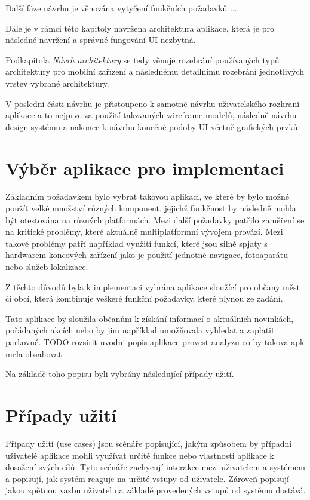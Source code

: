 Další fáze návrhu je věnována vytyčení funkčních požadavků ...

Dále je v rámci této kapitoly navržena architektura aplikace, která je pro následné navržení a správné fungování UI nezbytná. 

Podkapitola \textit{Návrh architektury} se tedy věnuje rozebrání používaných typů architektury pro mobilní zařízení a následnému detailnímu
rozebrání jednotlivých vrstev vybrané architektury.

V poslední části návrhu je přistoupeno k samotné návrhu uživatelského rozhraní aplikace a to nejprve za použití takzvaných wireframe modelů,
následně návrhu design systému a nakonec k návrhu konečné podoby UI včetně grafických prvků.



\section{Výběr aplikace pro implementaci}
Základním požadavkem bylo vybrat takovou aplikaci, ve které by bylo možné použít velké množství různých komponent, jejichž funkčnost by následně mohla být otestována
na různých platformách.
Mezi další požadavky patřilo zaměření se na kritické problémy, které aktuálně multiplatformní vývojem provází. 
Mezi takové problémy patří například využití funkcí, které jsou silně spjaty s hardwarem koncových zařízení jako je použití jednotné navigace, fotoaparátu 
nebo služeb lokalizace.

Z těchto důvodů byla k implementaci vybrána aplikace sloužící pro občany měst či obcí, která kombinuje veškeré funkční požadavky, které plynou ze zadání.

Tato aplikace by sloužila občanům k získání informací o aktuálních novinkách, pořádaných akcích nebo by jim například umožňovala vyhledat a zaplatit parkovné.
TODO rozsirit uvodni popis aplikace provest analyzu co by takova apk mela obsahovat

Na základě toho popisu byli vybrány následující případy užití.

\section{Případy užití}
Případy užití (use cases) jsou scénáře popisující, jakým způsobem by případní uživatelé aplikace mohli využívat určité funkce nebo
vlastnosti aplikace k dosažení svých cílů. \cite{} Tyto scénáře zachycují interakce mezi uživatelem a systémem a popisují, jak systém reaguje na určité vstupy od 
uživatele. Zároveň popisují jakou zpětnou vazbu uživatel na základě provedených vstupů od systému dostává.

